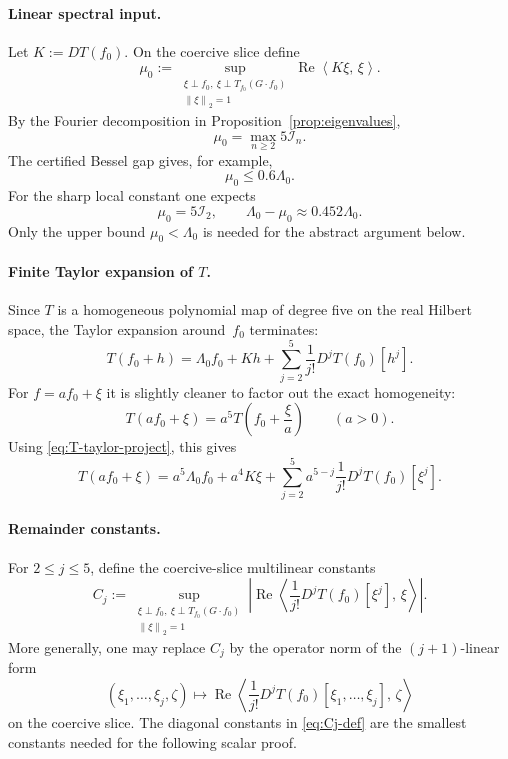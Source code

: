 \documentclass[12pt]{article}
\theoremstyle{definition}
\theoremstyle{remark}
\newcommand{\norm}[1]{\left\|#1\right\|}
\newcommand{\ip}[2]{\left\langle #1,\, #2\right\rangle}
\newcommand{\re}{\operatorname{Re}}
\begin{document}
\paragraph{Linear spectral input.}
Let \(K:=DT(f_0)\).  On the coercive slice define
\[
  \mu_0
  :=
  \sup_{\substack{\xi\perp f_0,\ \xi\perp T_{f_0}(G\cdot f_0)\\
                  \norm{\xi}_2=1}}
  \re\ip{K\xi}{\xi}.
\]
By the Fourier decomposition in Proposition~\ref{prop:eigenvalues},
\[
  \mu_0=\max_{n\geq2} 5\mathcal I_n.
\]
The certified Bessel gap gives, for example,
\[
  \mu_0\leq 0.6\Lambda_0.
\]
For the sharp local constant one expects
\[
  \mu_0=5\mathcal I_2,
  \qquad
  \Lambda_0-\mu_0\approx0.452\Lambda_0.
\]
Only the upper bound \(\mu_0<\Lambda_0\) is needed for the abstract
argument below.

\paragraph{Finite Taylor expansion of \(T\).}
Since \(T\) is a homogeneous polynomial map of degree five on the real
Hilbert space, the Taylor expansion around~\(f_0\) terminates:
\begin{equation}\label{eq:T-taylor-project}
  T(f_0+h)
  =
  \Lambda_0f_0
  +Kh
  +\sum_{j=2}^{5}\frac1{j!}D^jT(f_0)[h^j].
\end{equation}
For \(f=af_0+\xi\) it is slightly cleaner to factor out the exact
homogeneity:
\[
  T(af_0+\xi)
  =
  a^5T\left(f_0+\frac{\xi}{a}\right)
  \qquad(a>0).
\]
Using \eqref{eq:T-taylor-project}, this gives
\begin{equation}\label{eq:T-af0-xi}
  T(af_0+\xi)
  =
  a^5\Lambda_0f_0
  +a^4K\xi
  +\sum_{j=2}^{5}a^{5-j}\frac1{j!}D^jT(f_0)[\xi^j].
\end{equation}

\paragraph{Remainder constants.}
For \(2\leq j\leq5\), define the coercive-slice multilinear constants
\begin{equation}\label{eq:Cj-def}
  C_j
  :=
  \sup_{\substack{\xi\perp f_0,\ \xi\perp T_{f_0}(G\cdot f_0)\\
                  \norm{\xi}_2=1}}
  \left|
    \re\ip{\frac1{j!}D^jT(f_0)[\xi^j]}{\xi}
  \right|.
\end{equation}
More generally, one may replace \(C_j\) by the operator norm of the
\((j+1)\)-linear form
\[
  (\xi_1,\ldots,\xi_j,\zeta)
  \mapsto
  \re\ip{\frac1{j!}D^jT(f_0)[\xi_1,\ldots,\xi_j]}{\zeta}
\]
on the coercive slice.  The diagonal constants in \eqref{eq:Cj-def} are
the smallest constants needed for the following scalar proof.
\end{document}
